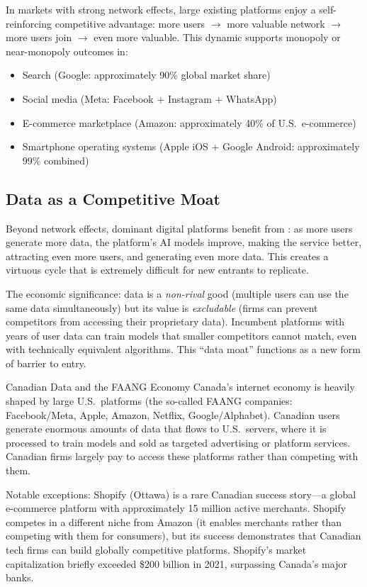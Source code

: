 In markets with strong network effects, large existing platforms enjoy a self-reinforcing competitive advantage: more users $\to$ more valuable network $\to$ more users join $\to$ even more valuable. This dynamic supports monopoly or near-monopoly outcomes in:
\begin{itemize}
  \item Search (Google: approximately 90\% global market share)
  \item Social media (Meta: Facebook + Instagram + WhatsApp)
  \item E-commerce marketplace (Amazon: approximately 40\% of U.S.\ e-commerce)
  \item Smartphone operating systems (Apple iOS + Google Android: approximately 99\% combined)
\end{itemize}

\subsection{Data as a Competitive Moat}

Beyond network effects, dominant digital platforms benefit from : as more users generate more data, the platform's AI models improve, making the service better, attracting even more users, and generating even more data. This creates a virtuous cycle that is extremely difficult for new entrants to replicate.

The economic significance: data is a \textit{non-rival} good (multiple users can use the same data simultaneously) but its value is \textit{excludable} (firms can prevent competitors from accessing their proprietary data). Incumbent platforms with years of user data can train models that smaller competitors cannot match, even with technically equivalent algorithms. This ``data moat'' functions as a new form of barrier to entry.

\begin{canexample}{Canadian Data and the FAANG Economy}
Canada's internet economy is heavily shaped by large U.S.\ platforms (the so-called
FAANG companies: Facebook/Meta, Apple, Amazon, Netflix, Google/Alphabet). Canadian
users generate enormous amounts of data that flows to U.S.\ servers, where it is
processed to train models and sold as targeted advertising or platform services.
Canadian firms largely pay to access these platforms rather than competing with them.

Notable exceptions: Shopify (Ottawa) is a rare Canadian success story---a global
e-commerce platform with approximately 15 million active merchants. Shopify competes
in a different niche from Amazon (it enables merchants rather than competing with them
for consumers), but its success demonstrates that Canadian tech firms can build globally
competitive platforms. Shopify's market capitalization briefly exceeded \$200 billion
in 2021, surpassing Canada's major banks.
\end{canexample}

